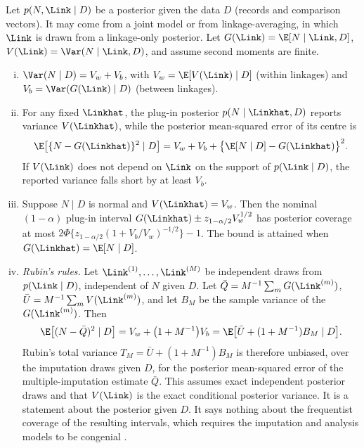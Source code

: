 \begin{proposition}\label{prop:totalvar}
Let $p(N,\Link\mid D)$ be a posterior given the data $D$ (records and comparison vectors). It may come from a joint model or from linkage-averaging, in which $\Link$ is drawn from a linkage-only posterior. Let $G(\Link)=\E[N\mid\Link,D]$, $V(\Link)=\Var(N\mid\Link,D)$, and assume second moments are finite.
\begin{enumerate}[(i)]
  \item $\Var(N\mid D)=V_w+V_b$, with $V_w=\E[V(\Link)\mid D]$ (within linkages) and $V_b=\Var(G(\Link)\mid D)$ (between linkages).
  \item For any fixed $\Linkhat$, the plug-in posterior $p(N\mid\Linkhat,D)$ reports variance $V(\Linkhat)$, while the posterior mean-squared error of its centre is
  \[
    \E\bigl[\{N-G(\Linkhat)\}^2\mid D\bigr]=V_w+V_b+\bigl\{\E[N\mid D]-G(\Linkhat)\bigr\}^2 .
  \]
  If $V(\Link)$ does not depend on $\Link$ on the support of $p(\Link\mid D)$, the reported variance falls short by at least $V_b$.
  \item Suppose $N\mid D$ is normal and $V(\Linkhat)=V_w$. Then the nominal $(1-\alpha)$ plug-in interval $G(\Linkhat)\pm z_{1-\alpha/2}V_w^{1/2}$ has posterior coverage at most $2\Phi\{z_{1-\alpha/2}(1+V_b/V_w)^{-1/2}\}-1$. The bound is attained when $G(\Linkhat)=\E[N\mid D]$.
  \item \emph{Rubin's rules.} Let $\Link^{(1)},\dots,\Link^{(M)}$ be independent draws from $p(\Link\mid D)$, independent of $N$ given $D$. Let $\bar Q=M^{-1}\sum_mG(\Link^{(m)})$, $\bar U=M^{-1}\sum_mV(\Link^{(m)})$, and let $B_M$ be the sample variance of the $G(\Link^{(m)})$. Then
  \[
    \E\bigl[(N-\bar Q)^2\mid D\bigr]=V_w+\bigl(1+M^{-1}\bigr)V_b=\E\bigl[\bar U+(1+M^{-1})B_M\mid D\bigr].
  \]
  Rubin's total variance $T_M=\bar U+(1+M^{-1})B_M$ \citep{rubin1987} is therefore unbiased, over the imputation draws given $D$, for the posterior mean-squared error of the multiple-imputation estimate $\bar Q$. This assumes exact independent posterior draws and that $V(\Link)$ is the exact conditional posterior variance. It is a statement about the posterior given $D$. It says nothing about the frequentist coverage of the resulting intervals, which requires the imputation and analysis models to be congenial \citep{meng1994}.
\end{enumerate}
\end{proposition}

